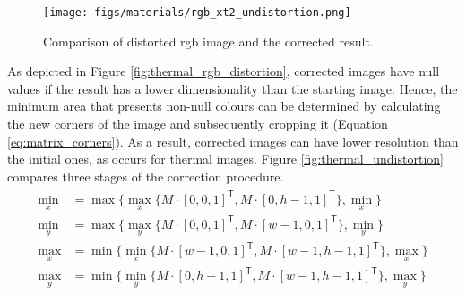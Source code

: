 \begin{figure}[ht]
	\centering
	\texttt{[image: figs/materials/rgb\_xt2\_undistortion.png]}
	\caption{Comparison of distorted \acrshort{rgb} image and the corrected result.}
	\label{fig:rgb_xt2_undistortion}
\end{figure}

As depicted in Figure \ref{fig:thermal_rgb_distortion}, corrected images have null values if the result has a lower dimensionality than the starting image. Hence, the minimum area that presents non-null colours can be determined by calculating the new corners of the image and subsequently cropping it (Equation \ref{eq:matrix_corners}). As a result, corrected images can have lower resolution than the initial ones, as occurs for thermal images. Figure \ref{fig:thermal_undistortion} compares three stages of the correction procedure. 
\begin{gather}
    \begin{aligned}
    \label{eq:matrix_corners}
    \min_x &= \max \{\max_x \{M \cdot [0, 0, 1]^\mathsf{T}, M \cdot [0, h - 1, 1]^\mathsf{T}\}, \min_x\}\\
    \min_y &= \max \{\max_y\{M \cdot [0, 0, 1]^\mathsf{T}, M \cdot [w - 1, 0, 1]^\mathsf{T}\}, \min_y\}\\
    \max_x &= \min \{\min_x\{M \cdot [w - 1, 0, 1]^\mathsf{T}, M \cdot [w - 1, h - 1, 1]^\mathsf{T}\}, \max_x\}\\
    \max_y &= \min \{\min_y\{M \cdot [0, h - 1, 1]^\mathsf{T}, M \cdot [w - 1, h - 1, 1]^\mathsf{T}\}, \max_y\}\\
    \end{aligned}
\end{gather}

